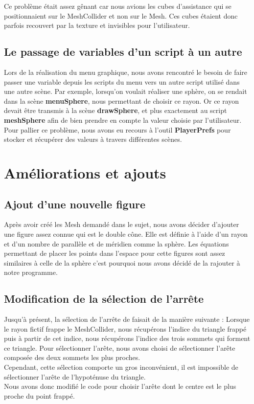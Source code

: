 \documentclass[a4paper,oneside,12pt,titlepage]{article}
\begin{document}
Ce problème était assez gênant car nous avions les cubes d'assistance qui se positionnaient sur le MeshCollider et non sur le Mesh. Ces cubes étaient donc parfois recouvert par la texture et invisibles pour l'utilisateur.


\subsection{Le passage de variables d'un script à un autre}

Lors de la réalisation du menu graphique, nous avons rencontré le besoin de faire passer une variable depuis les scripts du menu vers un autre script utilisé dans une autre scène. Par exemple, lorsqu'on voulait réaliser une sphère, on se rendait dans la scène \textbf{menuSphere}, nous permettant de choisir ce rayon. Or ce rayon devait être transmis à la scène \textbf{drawSphere}, et plus exactement au script \textbf{meshSphere} afin de bien prendre en compte la valeur choisie par l'utilisateur. Pour pallier ce problème, nous avons eu recours à l'outil \textbf{PlayerPrefs} pour stocker et récupérer des valeurs à travers différentes scènes.

\section{Améliorations et ajouts}

\subsection{Ajout d'une nouvelle figure}
Après avoir créé les Mesh demandé dans le sujet, nous avons décider d'ajouter une figure assez connue qui est le double cône. Elle est définie à l'aide d'un rayon et d'un nombre de parallèle et de méridien comme la sphère. Les équations permettant de placer les points dans l'espace pour cette figures sont assez similaires à celle de la sphère c'est pourquoi nous avons décidé de la rajouter à notre programme. 

\subsection{Modification de la sélection de l'arrête}
Jusqu'à présent, la sélection de l'arrête de faisait de la manière suivante : Lorsque le rayon fictif frappe le MeshCollider, nous récupérons l'indice du triangle frappé puis à partir de cet indice, nous récupérons l'indice des trois sommets qui forment ce triangle. Pour sélectionner l'arête, nous avons choisi de sélectionner l'arête composée des deux sommets les plus proches. 
\\Cependant, cette sélection comporte un gros inconvénient, il est impossible de sélectionner l'arête de l'hypoténuse du triangle. \\
Nous avons donc modifié le code pour choisir l'arête dont le centre est le plus proche du point frappé.
\end{document}
